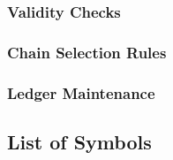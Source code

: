 \subsubsection{Validity Checks}


\subsubsection{Chain Selection Rules}


\subsubsection{Ledger Maintenance}


\newpage

\subsection{List of Symbols}\label{subsec:list-of-symbols}







